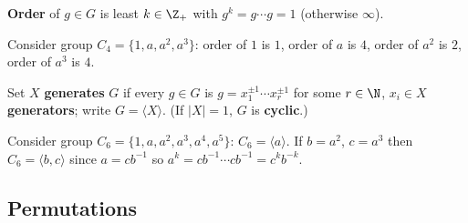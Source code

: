\begin{slide}
    \begin{definition}[order]
        \vspace{0pt}
        \textbf{Order} of $g \in G$ is least $k \in \Z_+$ with $g^k = g \dotsb g = 1$ (otherwise $\infty$).
    \end{definition} \pause

    \begin{example}
        \vspace{0pt}
        Consider group $C_4 = \{1,a,a^2,a^3\}$: order of $1$ is \pause $1$, order of $a$ is \pause $4$, order of $a^2$ is \pause $2$, order of $a^3$ is \pause $4$.
    \end{example} \pause

    \begin{definition}[generator]
        \vspace{0pt}
        Set $X$ \textbf{generates} $G$ if every $g \in G$ is $g = x_1^{\pm 1} \dotsb x_r^{\pm 1}$ for some $r \in \N$, $x_i \in X$ \textbf{generators}; write $G = \langle X \rangle$. \pause (If $|X| = 1$, $G$ is \textbf{cyclic}.)
    \end{definition} \pause

    \begin{example}
        \vspace{0pt}
        Consider group $C_6 = \{1,a,a^2,a^3,a^4,a^5\}$: \pause $C_6 = \langle a \rangle$. \pause If $b = a^2$, $c = a^3$ then $C_6 = \langle b,c \rangle$ since \pause $a = cb^{-1}$ so $a^k = cb^{-1} \dotsb cb^{-1} = c^kb^{-k}$.
    \end{example}
\end{slide}

\subsection{Permutations}

